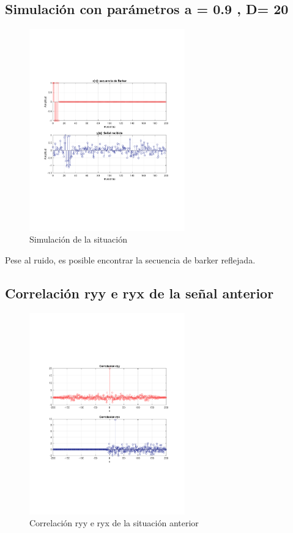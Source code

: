 	\subsection{Simulación con parámetros a = 0.9 , D= 20}
		\begin{figure}[H]
			\center
			\includegraphics[width=0.6\textwidth,clip, trim = {2cm 7.0cm 2.2cm 7.0cm}]{../imgs/4_radar_b.pdf}
			\caption{Simulación de la situación}
			\label{fig:radar_b_sim}
		\end{figure}
		
		Pese al ruido, es posible encontrar la secuencia de barker reflejada.
		
	\subsection{Correlación ryy e ryx de la señal anterior}
		\begin{figure}[H]
			\center
			\includegraphics[width=0.6\textwidth,clip, trim = {2cm 7.0cm 2.2cm 7.0cm}]{../imgs/4_radar_c.pdf}
			\caption{Correlación ryy e ryx de la situación anterior}
			\label{fig:radar_c_ryy_ryx}
		\end{figure}
		

